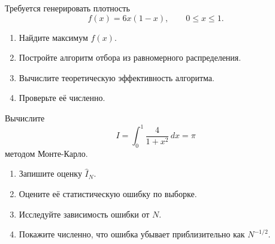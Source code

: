 \documentclass[
  russian,
  11pt,
  a4paper,
  open=any]{scrbook}
\providecommand{\tightlist}{%
  \setlength{\itemsep}{0pt}\setlength{\parskip}{0pt}}
\begin{document}
\begin{semanticpdfbox}[colback=BookCoralSoft,borderline west={1.2mm}{0pt}{BookCoral}]

\par\nopagebreak[4]\vspace{1.2mm}

Требуется генерировать плотность \[
f(x)=6x(1-x),
\qquad 0\le x\le1.
\]

\begin{enumerate}
\def\labelenumi{\arabic{enumi}.}
\tightlist
\item
  Найдите максимум \(f(x)\).
\item
  Постройте алгоритм отбора из равномерного распределения.
\item
  Вычислите теоретическую эффективность алгоритма.
\item
  Проверьте её численно.
\end{enumerate}

\end{semanticpdfbox}

\begin{semanticpdfbox}[colback=BookCoralSoft,borderline west={1.2mm}{0pt}{BookCoral}]

\par\nopagebreak[4]\vspace{1.2mm}

Вычислите \[
I=\int_0^1\frac{4}{1+x^2}\,dx=\pi
\] методом Монте-Карло.

\begin{enumerate}
\def\labelenumi{\arabic{enumi}.}
\tightlist
\item
  Запишите оценку \(\widehat I_N\).
\item
  Оцените её статистическую ошибку по выборке.
\item
  Исследуйте зависимость ошибки от \(N\).
\item
  Покажите численно, что ошибка убывает приблизительно как \(N^{-1/2}\).
\end{enumerate}

\end{semanticpdfbox}
\end{document}
